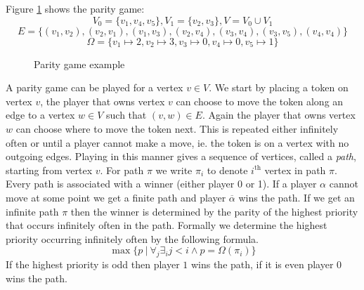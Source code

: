 \begin{example}
	Figure \ref{fig:simplepgpg} shows the parity game:
	\[ V_0 = \{v_1,v_4,v_5\},V_1 = \{v_2,v_3\}, V = V_0 \cup V_1\]
	\[ E = \{(v_1,v_2),(v_2,v_1),(v_1,v_3),(v_2,v_4),(v_3,v_4),(v_3,v_5),(v_4,v_4)\}\] 
	\[ \Omega = \{v_1 \mapsto 2, v_2 \mapsto 3, v_3 \mapsto 0, v_4 \mapsto 0, v_5 \mapsto 1 \}\]
	\begin{figure}[h]
		\centering
		\caption[Parity game example]{Parity game example}
		\label{fig:simplepgpg}
	\end{figure}
\end{example}

A parity game can be played for a vertex $v \in V$. We start by placing a token on vertex $v$, the player that owns vertex $v$ can choose to move the token along an edge to a vertex $w \in V$ such that $(v,w) \in E$. Again the player that owns vertex $w$ can choose where to move the token next. This is repeated either infinitely often or until a player cannot make a move, ie. the token is on a vertex with no outgoing edges. Playing in this manner gives a sequence of vertices, called a \textit{path}, starting from vertex $v$. For path $\pi$ we write $\pi_i$ to denote $i^\text{th}$ vertex in path $\pi$. Every path is associated with a winner (either player 0 or 1). If a player $\alpha$ cannot move at some point we get a finite path and player $\overline{\alpha}$ wins the path. If we get an infinite path $\pi$ then the winner is determined by the parity of the highest priority that occurs infinitely often in the path. Formally we determine the highest priority occurring infinitely often by the following formula.
\[ \max\{ p \ |\ \forall_j \exists_i j < i \wedge p = \Omega(\pi_i) \}\] 
If the highest priority is odd then player $1$ wins the path, if it is even player $0$ wins the path.

